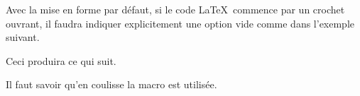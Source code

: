 \documentclass[10pt, a4paper]{article}
\begin{document}


\begin{tdocwarn}
    Avec la mise en forme par défaut, si le code \LaTeX\ commence par un crochet ouvrant, il faudra indiquer explicitement une option vide comme dans l'exemple suivant.


    Ceci produira ce qui suit.

    \medskip

    
\end{tdocwarn}


\begin{tdocnote}
    Il faut savoir qu'en coulisse la macro  est utilisée.

    \begin{tdoclatex}[std]
    \end{tdoclatex}
\end{tdocnote}
\end{document}

